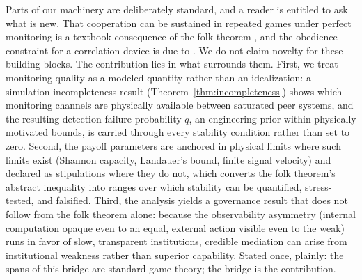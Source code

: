 \documentclass[manuscript,screen,review]{jair}
\begin{document}
Parts of our machinery are deliberately standard, and a reader is entitled to ask what is new. That cooperation can be sustained in repeated games under perfect monitoring is a textbook consequence of the folk theorem \cite{friedman.1971,fudenberg.maskin.1986}, and the obedience constraint for a correlation device is due to \citet{aumann.1974,aumann.1987}. We do not claim novelty for these building blocks. The contribution lies in what surrounds them. First, we treat monitoring quality as a modeled quantity rather than an idealization: a simulation-incompleteness result (Theorem~\ref{thm:incompleteness}) shows which monitoring channels are physically available between saturated peer systems, and the resulting detection-failure probability $q$, an engineering prior within physically motivated bounds, is carried through every stability condition rather than set to zero. Second, the payoff parameters are anchored in physical limits where such limits exist (Shannon capacity, Landauer's bound, finite signal velocity) and declared as stipulations where they do not, which converts the folk theorem's abstract inequality into ranges over which stability can be quantified, stress-tested, and falsified. Third, the analysis yields a governance result that does not follow from the folk theorem alone: because the observability asymmetry (internal computation opaque even to an equal, external action visible even to the weak) runs in favor of slow, transparent institutions, credible mediation can arise from institutional weakness rather than superior capability. Stated once, plainly: the spans of this bridge are standard game theory; the bridge is the contribution.
\end{document}
